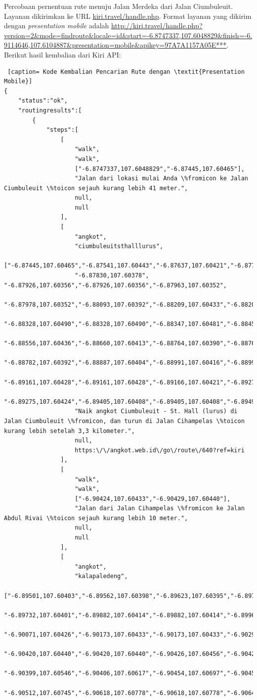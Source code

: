 Percobaan pernentuan rute menuju Jalan Merdeka dari Jalan Ciumbuleuit. Layanan dikirimkan ke URL \url{kiri.travel/handle.php}. Format layanan yang dikirim dengan \textit{presentation mobile} adalah \url{http://kiri.travel/handle.php?version=2&mode=findroute&locale=id&start=-6.8747337,107.6048829&finish=-6.9114646,107.6104887&presentation=mobile&apikey=97A7A1157A05E***}.
\newline
Berikut hasil kembalian dari Kiri API:
\begin{lstlisting} [caption= Kode Kembalian Pencarian Rute dengan \textit{Presentation Mobile}]
{
	"status":"ok",
	"routingresults":[
		{
			"steps":[
				[
					"walk",
					"walk",
					["-6.8747337,107.6048829","-6.87445,107.60465"],
					"Jalan dari lokasi mulai Anda \%fromicon ke Jalan Ciumbuleuit \%toicon sejauh kurang lebih 41 meter.",
					null,
					null
				],
				[
					"angkot",
					"ciumbuleuitsthalllurus",
					["-6.87445,107.60465","-6.87541,107.60443","-6.87637,107.60421","-6.87734,107.60400",
					"-6.87830,107.60378", "-6.87926,107.60356","-6.87926,107.60356","-6.87963,107.60352",
					"-6.87978,107.60352","-6.88093,107.60392","-6.88209,107.60433","-6.88209,107.60433",
					"-6.88328,107.60490","-6.88328,107.60490","-6.88347,107.60481","-6.88452,107.60459",
					"-6.88556,107.60436","-6.88660,107.60413","-6.88764,107.60390","-6.88764,107.60391",
					"-6.88782,107.60392","-6.88887,107.60404","-6.88991,107.60416","-6.88991,107.60416",
					"-6.89161,107.60428","-6.89161,107.60428","-6.89166,107.60421","-6.89275,107.60424",
					"-6.89275,107.60424","-6.89405,107.60408","-6.89405,107.60408","-6.89496,107.60400"],
					"Naik angkot Ciumbuleuit - St. Hall (lurus) di Jalan Ciumbuleuit \%fromicon, dan turun di Jalan Cihampelas \%toicon kurang lebih setelah 3,3 kilometer.",
					null,
					https:\/\/angkot.web.id\/go\/route\/640?ref=kiri
				],
				[
					"walk",
					"walk",
					["-6.90424,107.60433","-6.90429,107.60440"],
					"Jalan dari Jalan Cihampelas \%fromicon ke Jalan Abdul Rivai \%toicon sejauh kurang lebih 10 meter.",
					null,
					null
				],
				[
					"angkot",
					"kalapaledeng",
					["-6.89501,107.60403","-6.89562,107.60398","-6.89623,107.60395","-6.89732,107.60401",
					"-6.89732,107.60401","-6.89882,107.60414","-6.89882,107.60414","-6.89969,107.60418",
					"-6.90071,107.60426","-6.90173,107.60433","-6.90173,107.60433","-6.90297,107.60437",
					"-6.90420,107.60440","-6.90420,107.60440","-6.90426,107.60456","-6.90422,107.60481",
					"-6.90399,107.60546","-6.90406,107.60617","-6.90454,107.60697","-6.90454,107.60697",
					"-6.90512,107.60745","-6.90618,107.60778","-6.90618,107.60778","-6.90643,107.60787",

\end{lstlisting}
